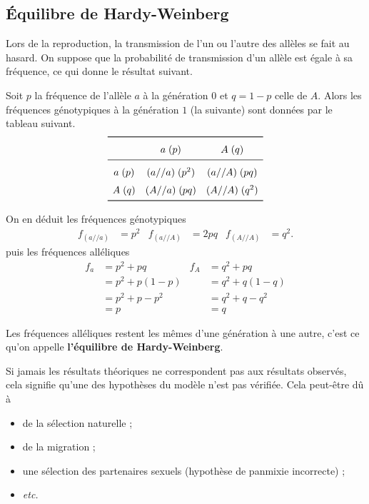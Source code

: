 \documentclass[11pt]{article}
\begin{document}
\subsection{Équilibre de Hardy-Weinberg}
Lors de la reproduction, la transmission de l'un ou l'autre des allèles se fait
au hasard. On suppose que la probabilité de transmission d'un allèle est égale à
sa fréquence, ce qui donne le résultat suivant.
\begin{prop}
  Soit $p$ la fréquence de l'allèle $a$ à la génération $0$ et $q=1-p$ celle de
  $A$. Alors les fréquences génotypiques à la génération $1$ (la suivante) sont
  données par le tableau suivant.
  \[
    \renewcommand{\arraystretch}{1.5}
    \begin{array}{ccc}
      \toprule
     & a\;(p) & A\;(q) \\
     \midrule
     a\;(p) & (a//a)\;(p^2) & (a//A)\;(pq)\\
     A\;(q) & (A//a)\;(pq) & (A//A)\;(q^2)\\
     \bottomrule
    \end{array}
  \]
\end{prop}
\noindent On en déduit les fréquences génotypiques
\begin{align*}
  f_{(a//a)} &= p^2 &
  f_{(a//A)} &= 2pq &
  f_{(A//A)} &= q^2.
\end{align*}
puis les fréquences alléliques
\begin{align*}
  f_{a} &= p^2+pq & 
  f_{A} &= q^2+pq \\
  &= p^2 + p(1-p) &
  &= q^2 + q(1-q) \\
  &= p^2 + p-p^2 &
  &= q^2 + q-q^2 \\
  &= p &
  &= q
\end{align*}
\begin{prop}
  Les fréquences alléliques restent les mêmes d'une génération à une autre,
  c'est ce qu'on appelle \textbf{l'équilibre de Hardy-Weinberg}.
\end{prop}
\noindent Si jamais les résultats théoriques ne correspondent pas aux résultats
observés, cela signifie qu'une des hypothèses du modèle n'est pas vérifiée. Cela
peut-être dû à
\begin{itemize}
  \item de la sélection naturelle ;
  \item de la migration ;
  \item une sélection des partenaires sexuels (hypothèse de panmixie incorrecte) ;
  \item \emph{etc.}
\end{itemize}
\end{document}
